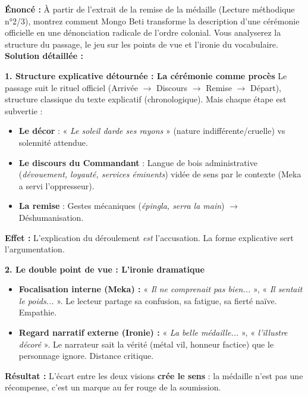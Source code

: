\documentclass[11pt]{article}
\newcommand{\cle}[1]{{\popxbold\color{popdark}#1}}
\begin{document}
\begin{exoresolu}
    \textbf{Énoncé :} À partir de l'extrait de la remise de la médaille (Lecture méthodique n°2/3), montrez comment Mongo Beti transforme la description d'une cérémonie officielle en une dénonciation radicale de l'ordre colonial. Vous analyserez la structure du passage, le jeu sur les points de vue et l'ironie du vocabulaire.
    \tcblower
    \textbf{Solution détaillée :}
    
    \textbf{1. Structure explicative détournée : La cérémonie comme procès}
    Le passage suit le rituel officiel (Arrivée $\rightarrow$ Discours $\rightarrow$ Remise $\rightarrow$ Départ), structure classique du \cle{texte explicatif} (chronologique). Mais chaque étape est subvertie :
    \begin{itemize}
        \item \textbf{Le décor} : « \emph{Le soleil darde ses rayons} » (nature indifférente/cruelle) vs solennité attendue.
        \item \textbf{Le discours du Commandant} : Langue de bois administrative (\emph{dévouement, loyauté, services éminents}) vidée de sens par le contexte (Meka a servi l'oppresseur).
        \item \textbf{La remise} : Gestes mécaniques (\emph{épingla, serra la main}) $\rightarrow$ Déshumanisation.
    \end{itemize}
    \textbf{Effet :} L'explication du déroulement \emph{est} l'accusation. La forme explicative sert l'argumentation.
    
    \textbf{2. Le double point de vue : L'ironie dramatique}
    \begin{itemize}
        \item \textbf{Focalisation interne (Meka) :} « \emph{Il ne comprenait pas bien...} », « \emph{Il sentait le poids...} ». Le lecteur partage sa confusion, sa fatigue, sa fierté naïve. \cle{Empathie}.
        \item \textbf{Regard narratif externe (Ironie) :} « \emph{La belle médaille...} », « \emph{l'illustre décoré} ». Le narrateur sait la vérité (métal vil, honneur factice) que le personnage ignore. \cle{Distance critique}.
    \end{itemize}
    \textbf{Résultat :} L'écart entre les deux visions \textbf{crée le sens} : la médaille n'est pas une récompense, c'est un \cle{marque au fer rouge} de la soumission.
    

\end{exoresolu}
\end{document}
